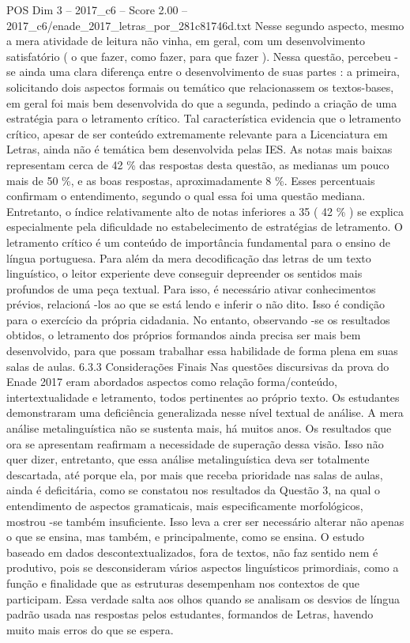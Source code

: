 \begin{textsample}{POS Dim 3 – 2017\_c6 – Score 2.00 – 2017\_c6/enade\_2017\_letras\_por\_281c81746d.txt}
Nesse segundo aspecto, mesmo a mera atividade de leitura não vinha, em geral, com um desenvolvimento satisfatório ( o que fazer, como fazer, para que fazer ).
Nessa questão, percebeu -se ainda uma clara diferença entre o desenvolvimento de suas partes : a primeira, solicitando dois aspectos formais ou temático que relacionassem os textos-bases, em geral foi mais bem desenvolvida do que a segunda, pedindo a criação de uma estratégia para o letramento crítico.
Tal característica evidencia que o letramento crítico, apesar de ser conteúdo extremamente relevante para a Licenciatura em Letras, ainda não é temática bem desenvolvida pelas IES.
As notas mais baixas representam cerca de 42 \% das respostas desta questão, as medianas um pouco mais de 50 \%, e as boas respostas, aproximadamente 8 \%.
Esses percentuais confirmam o entendimento, segundo o qual essa foi uma questão mediana.
Entretanto, o índice relativamente alto de notas inferiores a 35 ( 42 \% ) se explica especialmente pela dificuldade no estabelecimento de estratégias de letramento.
O letramento crítico é um conteúdo de importância fundamental para o ensino de língua portuguesa.
Para além da mera decodificação das letras de um texto linguístico, o leitor experiente deve conseguir depreender os sentidos mais profundos de uma peça textual.
Para isso, é necessário ativar conhecimentos prévios, relacioná -los ao que se está lendo e inferir o não dito.
Isso é condição para o exercício da própria cidadania.
No entanto, observando -se os resultados obtidos, o letramento dos próprios formandos ainda precisa ser mais bem desenvolvido, para que possam trabalhar essa habilidade de forma plena em suas salas de aulas. 6.3.3 Considerações Finais Nas questões discursivas da prova do Enade 2017 eram abordados aspectos como relação forma/conteúdo, intertextualidade e letramento, todos pertinentes ao próprio texto.
Os estudantes demonstraram uma deficiência generalizada nesse nível textual de análise.
A mera análise metalinguística não se sustenta mais, há muitos anos.
Os resultados que ora se apresentam reafirmam a necessidade de superação dessa visão.
Isso não quer dizer, entretanto, que essa análise metalinguística deva ser totalmente descartada, até porque ela, por mais que receba prioridade nas salas de aulas, ainda é deficitária, como se constatou nos resultados da Questão 3, na qual o entendimento de aspectos gramaticais, mais especificamente morfológicos, mostrou -se também insuficiente.
Isso leva a crer ser necessário alterar não apenas o que se ensina, mas também, e principalmente, como se ensina.
O estudo baseado em dados descontextualizados, fora de textos, não faz sentido nem é produtivo, pois se desconsideram vários aspectos linguísticos primordiais, como a função e finalidade que as estruturas desempenham nos contextos de que participam.
Essa verdade salta aos olhos quando se analisam os desvios de língua padrão usada nas respostas pelos estudantes, formandos de Letras, havendo muito mais erros do que se espera.

\end{textsample}
